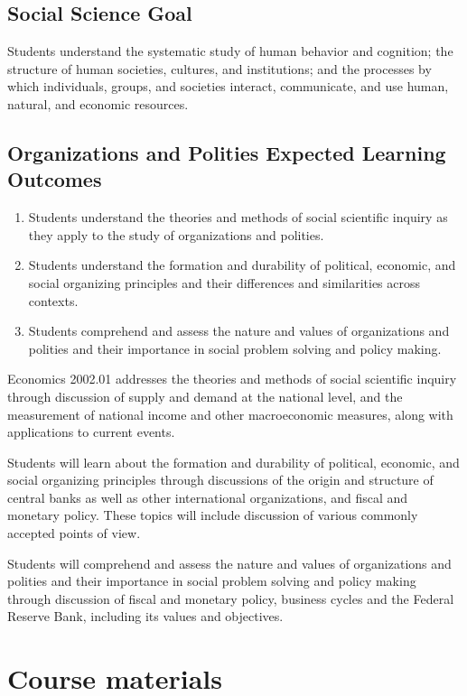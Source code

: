 \documentclass[12pt]{article}
\begin{document}
\subsection*{Social Science Goal}

Students understand the systematic study of human behavior and cognition; the structure of human societies, cultures, and institutions; and the processes by which individuals, groups, and societies interact, communicate, and use human, natural, and economic resources.

\subsection*{Organizations and Polities Expected Learning Outcomes}
\begin{enumerate}
    \item Students understand the theories and methods of social scientific inquiry as they apply to the study of organizations and polities.
    \item Students understand the formation and durability of political, economic, and social organizing principles and their differences and similarities across contexts.
    \item Students comprehend and assess the nature and values of organizations and polities and their importance in social problem solving and policy making.
\end{enumerate}

Economics 2002.01 addresses the theories and methods of social scientific inquiry through discussion of supply and demand at the national level, and the measurement of national income and other macroeconomic measures, along with applications to current events.

Students will learn about the formation and durability of political, economic, and social organizing principles through discussions of the origin and structure of central banks as well as other international organizations, and fiscal and monetary policy. These topics will include discussion of various commonly accepted points of view.

Students will comprehend and assess the nature and values of organizations and polities and their importance in social problem solving and policy making through discussion of fiscal and monetary policy, business cycles and the Federal Reserve Bank, including its values and objectives.

\section*{Course materials}
\end{document}
